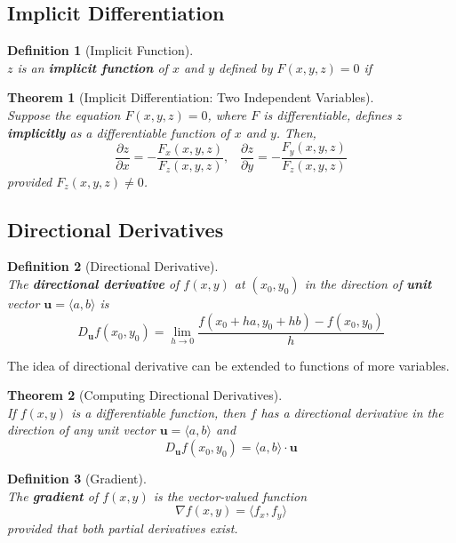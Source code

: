 \documentclass[12pt]{article}
\newtheorem{definition}{Definition}[section]
\newtheorem{theorem}{Theorem}[section]
\theoremstyle{definition}
\newcommand\ve[1]{\mathbf{#1}}
\begin{document}
\subsection{Implicit Differentiation}
\begin{definition}[Implicit Function]
\hfill\\\normalfont $z$ is an \textbf{implicit function} of $x$ and $y$ defined by $F(x,y,z)=0$ if
\begin{center}
\end{center}
\end{definition}
\begin{theorem}[Implicit Differentiation: Two Independent Variables]
\hfill\\\normalfont Suppose the equation $F(x,y,z)=0$, where $F$ is \textit{differentiable}, defines $z$ \textbf{implicitly} as a differentiable function of $x$ and $y$. Then,
\[
\frac{\partial z}{\partial x}=-\frac{F_x(x,y,z)}{F_z(x,y,z)},\;\;\;\frac{\partial z}{\partial y}=-\frac{F_y(x,y,z)}{F_z(x,y,z)}
\]
provided $F_z(x,y,z)\neq 0$.
\end{theorem}
\subsection{Directional Derivatives}
\begin{definition}[Directional Derivative]
\hfill\\\normalfont The \textbf{directional derivative} of $f(x,y)$ at $(x_0,y_0)$ in the direction of \textbf{unit} vector $\ve{u}=\langle a,b\rangle$ is
\[
D_\ve{u}f(x_0,y_0) = \lim_{h\to 0}\frac{f(x_0+ha,y_0+hb)-f(x_0,y_0)}{h}
\]
\end{definition}
The idea of directional derivative can be extended to functions of more variables.
\begin{theorem}[Computing Directional Derivatives]
\hfill\\\normalfont If $f(x,y)$ is a \textit{differentiable} function, then $f$ has a directional derivative in the direction of any unit vector $\ve{u}=\langle a,b\rangle$ and
\[
D_\ve{u}f(x_0,y_0)=\langle a,b\rangle \cdot \ve{u}
\]
\end{theorem}
\begin{definition}[Gradient]
\hfill\\\normalfont The \textbf{gradient} of $f(x,y)$ is the vector-valued function
\[
\nabla f(x,y) = \langle f_x,f_y\rangle
\]
provided that both partial derivatives exist.
\end{definition}
\clearpage
\end{document}

